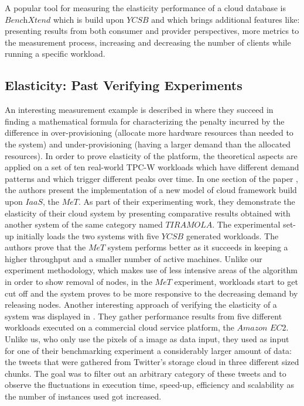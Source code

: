 \documentclass[conference]{IEEEtran}
\begin{document}
A popular tool for measuring the elasticity performance of a cloud database is $\textit{BenchXtend}$ \cite{de2012benchxtend} which is build upon $\textit{YCSB}$ and which brings additional features like: presenting results from both consumer and provider perspectives, more metrics to the measurement process, increasing and decreasing the number of clients while running a specific workload.

\subsection{Elasticity: Past Verifying Experiments}
An interesting measurement example is described in \cite{islam2012consumer} where they succeed in finding a mathematical formula for characterizing the penalty incurred by the difference in over-provisioning (allocate more hardware resources than needed to the system) and under-provisioning (having a larger demand than the allocated resources). In order to prove elasticity of the platform, the theoretical aspects are applied on a set of ten real-world TPC-W workloads which have different demand patterns and which trigger different peaks over time.
In one section of the paper \cite{cruz2013met}, the authors present the implementation of a new model of cloud framework  build upon $\textit{IaaS}$, the $\textit{MeT}$. As part of their experimenting work, they demonstrate the elasticity of their cloud system by presenting comparative results obtained with another system of the same category named $\textit{TIRAMOLA}$. The experimental set-up initially loads the two systems  with five  $\textit{YCSB}$ generated workloads. The authors prove that the $\textit{MeT}$ system performs better as it succeeds in keeping a higher throughput and a smaller number of active machines. Unlike our experiment methodology, which makes use of less intensive areas of the algorithm in order to show removal of nodes, in the $\textit{MeT}$ experiment, workloads start to get cut off and the system  proves to be more responsive to the decreasing demand by releasing nodes.
Another interesting approach of verifying the elasticity of a system was displayed in \cite{hwang2015cloud}. They gather performance results from five different workloads executed on a commercial cloud service platform, the $\textit{Amazon EC2}$. Unlike us, who only use the pixels of a image as data input, they used as input for one of their benchmarking experiment a considerably larger amount of data: the tweets that were gathered from Twitter's storage cloud in three different sized chunks. The goal was to filter out an arbitrary category of these tweets and to observe the fluctuations in execution time, speed-up, efficiency and scalability as the number of instances used got increased.\\
\end{document}

